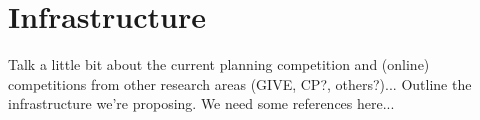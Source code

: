 \section{Infrastructure}
\label{sec:infrastructure}

Talk a little bit about the current planning competition and (online)
competitions from other research areas (GIVE, CP?, others?)... Outline the
infrastructure we're proposing. We need some references here...


